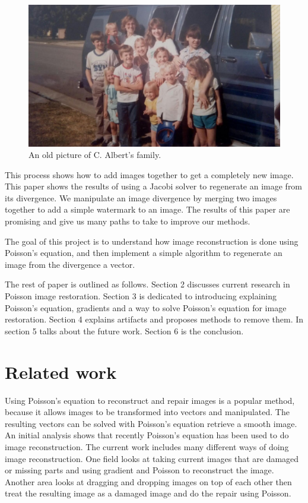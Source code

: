 \documentclass[10pt,twopage]{acmsiggraph}
\begin{document}
\begin{figure}
\centering
\includegraphics[width=.44\textwidth]{fig/family.jpg}
\caption{An old picture of C. Albert's family.}
\label{family}
\end{figure}


This process shows how to add images together to get a completely new image. This paper shows the results of using a Jacobi solver to regenerate an image from its divergence. We manipulate an image divergence by merging two images together to add a simple watermark to an image. The results of this paper are promising and give us many paths to take to improve our methods.

The goal of this project is to understand how image reconstruction is done using Poisson's equation, and then implement a simple algorithm to regenerate an image from the divergence a vector. 

The rest of paper is outlined as follows. Section 2 discusses current research in Poisson image restoration. Section 3 is dedicated to introducing explaining Poisson's equation, gradients and a way to solve Poisson's equation for image restoration. Section 4  explains artifacts and proposes methods to remove them. In section 5 talks about the future work. Section 6 is the conclusion.


\section{Related work}
\label{relatedWork}
Using Poisson's equation to reconstruct and repair images is a popular method, because it allows images to be transformed into vectors and manipulated. The resulting vectors can be solved with Poisson's equation retrieve a smooth image. An initial analysis shows that recently \cite{Bertalmio} Poisson's equation has been used to do image reconstruction. The current work includes many different ways of doing image reconstruction. One field looks at taking current images that are damaged or missing parts and using gradient and Poisson to reconstruct the image. Another area looks at dragging and dropping images on top of each other then treat the resulting image as a damaged image and do the repair using Poisson.
\end{document}
